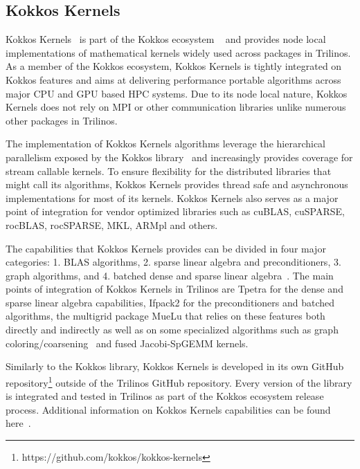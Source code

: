 
\subsection{Kokkos Kernels}\label{subsec:kk}
Kokkos Kernels~\cite{rajamanickam2021kokkoskernels} is part of the Kokkos ecosystem
~\cite{trott2021kokkos} and provides node local implementations of mathematical kernels
widely used across packages in Trilinos. As a member of the Kokkos
ecosystem, Kokkos Kernels is tightly integrated on Kokkos features and aims at
delivering performance portable algorithms across major CPU and GPU based HPC systems.
Due to its node local nature, Kokkos Kernels does not rely on MPI or other communication
libraries unlike numerous other packages in Trilinos.

The implementation of Kokkos Kernels algorithms leverage the hierarchical parallelism
exposed by the Kokkos library~\cite{kim2017designing} and increasingly provides coverage
for stream callable kernels. To ensure flexibility for the distributed libraries that
might call its algorithms, Kokkos Kernels provides thread safe and asynchronous
implementations for most of its kernels. Kokkos Kernels also serves as a major point of
integration for vendor optimized libraries such as cuBLAS, cuSPARSE, rocBLAS, rocSPARSE,
MKL, ARMpl and others.

The capabilities that Kokkos Kernels provides can be divided in four major categories:
1. BLAS algorithms, 2. sparse linear algebra and preconditioners, 3. graph algorithms, and
4. batched dense and sparse linear algebra~\cite{liegeois2023performance}. The main
points of integration of Kokkos Kernels in Trilinos are Tpetra for the dense and sparse
linear algebra capabilities, Ifpack2 for the preconditioners and batched algorithms,
the multigrid package MueLu that relies on these features both directly and indirectly
as well as on some specialized algorithms such as graph
coloring/coarsening~\cite{kelley2022parallel} and fused Jacobi-SpGEMM kernels.

Similarly to the Kokkos library, Kokkos Kernels is developed in its own GitHub
repository\footnote{https://github.com/kokkos/kokkos-kernels} outside of the Trilinos
GitHub repository. Every version of the library is integrated and tested in Trilinos
as part of the Kokkos ecosystem release process. Additional information on Kokkos
Kernels capabilities can be found here~\cite{deveci2018multithreaded,wolf2017fast}.


